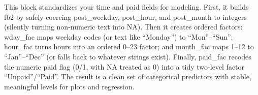 \documentclass[
]{article}
\newenvironment{Shaded}{\begin{snugshade}}{\end{snugshade}}
\newcommand{\AttributeTok}[1]{\textcolor[rgb]{0.13,0.29,0.53}{#1}}
\newcommand{\CommentTok}[1]{\textcolor[rgb]{0.56,0.35,0.01}{\textit{#1}}}
\newcommand{\ConstantTok}[1]{\textcolor[rgb]{0.56,0.35,0.01}{#1}}
\newcommand{\ControlFlowTok}[1]{\textcolor[rgb]{0.13,0.29,0.53}{\textbf{#1}}}
\newcommand{\DecValTok}[1]{\textcolor[rgb]{0.00,0.00,0.81}{#1}}
\newcommand{\FunctionTok}[1]{\textcolor[rgb]{0.13,0.29,0.53}{\textbf{#1}}}
\newcommand{\NormalTok}[1]{#1}
\newcommand{\OtherTok}[1]{\textcolor[rgb]{0.56,0.35,0.01}{#1}}
\newcommand{\SpecialCharTok}[1]{\textcolor[rgb]{0.81,0.36,0.00}{\textbf{#1}}}
\newcommand{\StringTok}[1]{\textcolor[rgb]{0.31,0.60,0.02}{#1}}
\begin{document}
\begin{Shaded}
\end{Shaded}

This block standardizes your time and paid fields for modeling. First,
it builds fb2 by safely coercing post\_weekday, post\_hour, and
post\_month to integers (silently turning non-numeric text into NA).
Then it creates ordered factors: wday\_fac maps weekday codes (or text
like ``Monday'') to ``Mon''--``Sun''; hour\_fac turns hours into an
ordered 0--23 factor; and month\_fac maps 1--12 to ``Jan''--``Dec'' (or
falls back to whatever strings exist). Finally, paid\_fac recodes the
numeric paid flag (0/1, with NA treated as 0) into a tidy two-level
factor ``Unpaid''/``Paid''. The result is a clean set of categorical
predictors with stable, meaningful levels for plots and regression.

\begin{Shaded}
\end{Shaded}
\end{document}
